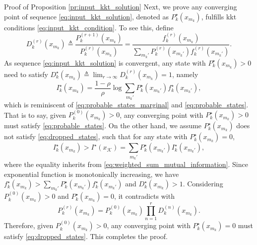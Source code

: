 \documentclass[journal]{IEEEtran}
\begin{document}
\begin{appendix}
\begin{subsection}{Proof of Proposition \ref{pr:input_kkt_solution}}
		Next, we prove any converging point of sequence \eqref{eq:input_kkt_solution}, denoted as $P_k^\star(x_{m_k})$, fulfills \gls{kkt} conditions \eqref{eq:input_kkt_condition}.
		To see this, define
		\begin{equation}
			D_k^{(r)}(x_{m_k}) \triangleq \frac{P_k^{(r+1)}(x_{m_k})}{P_k^{(r)}(x_{m_k})} = \frac{f_k^{(r)}(x_{m_k})}{\sum_{m_k'} P_k^{(r)}(x_{m_k'}) f_k^{(r)}(x_{m_k'})}.
		\end{equation}
		As sequence \eqref{eq:input_kkt_solution} is convergent, any state with $P_k^\star(x_{m_k}) > 0$ need to satisfy $D_k^\star(x_{m_k}) \triangleq \lim_{r \to \infty} D_k^{(r)}(x_{m_k}) = 1$, namely
		\begin{equation}
			I_k^\star(x_{m_k}) = \frac{1 - \rho}{\rho} \log \sum_{m_k'} P_k^\star(x_{m_k'}) f_k^\star(x_{m_k'}),
		\end{equation}
		which is reminiscent of \eqref{eq:probable_states_marginal} and \eqref{eq:probable_states}.
		That is to say, given $P_k^{(0)}(x_{m_k}) > 0$, any converging point with $P_k^\star(x_{m_k}) > 0$ must satisfy \eqref{eq:probable_states}.
		On the other hand, we assume $P_k^\star(x_{m_k})$ does not satisfy \eqref{eq:dropped_states}, such that for any state with $P_k^\star(x_{m_k}) = 0$,
		\begin{equation}
			I_k^\star(x_{m_k}) > I^\star(x_{\mathcal{K}}) = \sum_{m_k'} P_k^\star(x_{m_k'}) I_k^\star(x_{m_k'}),
		\end{equation}
		where the equality inherits from \eqref{eq:weighted_sum_mutual_information}.
		Since exponential function is monotonically increasing, we have $f_k^\star(x_{m_k}) > \sum_{m_k'} P_k^\star(x_{m_k'}) f_k^\star(x_{m_k'})$ and $D_k^\star(x_{m_k}) > 1$.
		Considering $P_k^{(0)}(x_{m_k}) > 0$ and $P_k^\star(x_{m_k}) = 0$, it contradicts with
		\begin{equation}
			P_k^{(r)}(x_{m_k}) = P_k^{(0)}(x_{m_k}) \prod_{n=1}^r D_k^{(n)}(x_{m_k}).
		\end{equation}
		Therefore, given $P_k^{(0)}(x_{m_k}) > 0$, any converging point with $P_k^\star(x_{m_k}) = 0$ must satisfy \eqref{eq:dropped_states}.
		This completes the proof.
		\label{ap:input_kkt_solution}
	\end{subsection}


\end{appendix}
\end{document}
